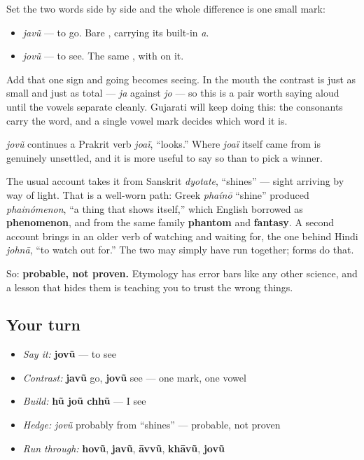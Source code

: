 \begin{grammarlens}[title={What you've built: one mark apart}]
Set the two words side by side and the whole difference is one small mark:

\begin{itemize}
\raggedright
  \item \textbf{} \emph{javũ} — to go. Bare \textbf{}, carrying its built-in \emph{a}.
  \item \textbf{} \emph{jovũ} — to see. The same \textbf{}, with \textbf{} on it.
\end{itemize}

Add that one sign and going becomes seeing. In the mouth the contrast is just as small and just as total — \emph{ja} against \emph{jo} — so this is a pair worth saying aloud until the vowels separate cleanly. Gujarati will keep doing this: the consonants carry the word, and a single vowel mark decides which word it is.
\end{grammarlens}

\begin{cousinweb}
\emph{jovũ} continues a Prakrit verb \emph{joaï}, \textquotedblleft{}looks.\textquotedblright{} Where \emph{joaï} itself came from is genuinely unsettled, and it is more useful to say so than to pick a winner.

The usual account takes it from Sanskrit \emph{dyotate}, \textquotedblleft{}shines\textquotedblright{} — sight arriving by way of light. That is a well-worn path: Greek \emph{phaínō} \textquotedblleft{}shine\textquotedblright{} produced \emph{phainómenon}, \textquotedblleft{}a thing that shows itself,\textquotedblright{} which English borrowed as \textbf{phenomenon}, and from the same family \textbf{phantom} and \textbf{fantasy}. A second account brings in an older verb of watching and waiting for, the one behind Hindi \emph{johnā}, \textquotedblleft{}to watch out for.\textquotedblright{} The two may simply have run together; forms do that.

So: \textbf{probable, not proven.} Etymology has error bars like any other science, and a lesson that hides them is teaching you to trust the wrong things.
\end{cousinweb}

\subsection*{Your turn}
\begin{itemize}
\raggedright
  \item \emph{Say it:} \textbf{jovũ} — to see
  \item \emph{Contrast:} \textbf{javũ} go, \textbf{jovũ} see — one mark, one vowel
  \item \emph{Build:} \textbf{hũ joũ chhũ} — I see
  \item \emph{Hedge:} \emph{jovũ} probably from \textquotedblleft{}shines\textquotedblright{} — probable, not proven
  \item \emph{Run through:} \textbf{hovũ}, \textbf{javũ}, \textbf{āvvũ}, \textbf{khāvũ}, \textbf{jovũ}
\end{itemize}

